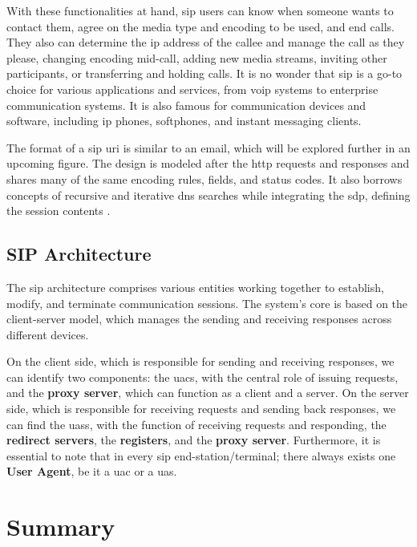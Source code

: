 With these functionalities at hand, \gls{sip} users can know when someone wants to contact them, agree on the media type and encoding to be used, and end calls. They also can determine the \gls{ip} address of the callee and manage the call as they please, changing encoding mid-call, adding new media streams, inviting other participants, or transferring and holding calls. It is no wonder that \gls{sip} is a go-to choice for various applications and services, from \gls{voip} systems to enterprise communication systems. It is also famous for communication devices and software, including \gls{ip} phones, softphones, and instant messaging clients.

The format of a \gls{sip} \gls{uri} is similar to an email, which will be explored further in an upcoming figure. The design is modeled after the \gls{http} requests and responses and shares many of the same encoding rules, fields, and status codes. It also borrows concepts of recursive and iterative \gls{dns} searches while integrating the \gls{sdp}, defining the session contents \citep{kurose2017}.

\subsection{SIP Architecture}

The \gls{sip} architecture comprises various entities working together to establish, modify, and terminate communication sessions. The system's core is based on the client-server model, which manages the sending and receiving responses across different devices.

On the client side, which is responsible for sending and receiving responses, we can identify two components: the \glspl{uac}, with the central role of issuing requests, and the \textbf{proxy server}, which can function as a client and a server. On the server side, which is responsible for receiving requests and sending back responses, we can find the \glspl{uas}, with the function of receiving requests and responding, the \textbf{redirect servers}, the \textbf{registers}, and the \textbf{proxy server}. Furthermore, it is essential to note that in every \gls{sip} end-station/terminal; there always exists one \textbf{User Agent}, be it a \gls{uac} or a \gls{uas}.






\section{Summary}

